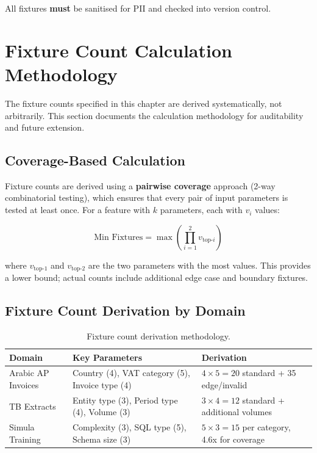 \documentclass[12pt,a4paper,twoside]{report}
\begin{document}
All fixtures \textbf{must} be sanitised for PII and checked into version control.

\section{Fixture Count Calculation Methodology}
\label{sec:fixture-count-methodology}

The fixture counts specified in this chapter are derived systematically, not
arbitrarily. This section documents the calculation methodology for auditability
and future extension.

\subsection{Coverage-Based Calculation}

Fixture counts are derived using a \textbf{pairwise coverage} approach (2-way
combinatorial testing), which ensures that every pair of input parameters is
tested at least once. For a feature with $k$ parameters, each with $v_i$ values:

\[
\text{Min Fixtures} = \max\left(\prod_{i=1}^{2} v_{\text{top-}i}\right)
\]

\noindent
where $v_{\text{top-}1}$ and $v_{\text{top-}2}$ are the two parameters with the
most values. This provides a lower bound; actual counts include additional
edge case and boundary fixtures.

\subsection{Fixture Count Derivation by Domain}

\begin{table}[htbp]
\centering
\caption{Fixture count derivation methodology.}
\label{tab:fixture-derivation}
\footnotesize
\begin{tabularx}{\textwidth}{@{}l l X@{}}
\toprule
\textbf{Domain} & \textbf{Key Parameters} & \textbf{Derivation} \\
\midrule
Arabic AP Invoices &
Country (4), VAT category (5), Invoice type (4) &
$4 \times 5 = 20$ standard + 35 edge/invalid \\
TB Extracts &
Entity type (3), Period type (4), Volume (3) &
$3 \times 4 = 12$ standard + additional volumes \\
Simula Training &
Complexity (3), SQL type (5), Schema size (3) &
$5 \times 3 = 15$ per category, 4.6x for coverage \\
\bottomrule
\end{tabularx}
\end{table}
\end{document}
